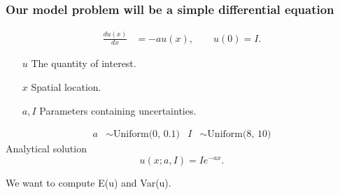 \documentclass[handout]{beamer}
\begin{document}
\begin{frame}
 \frametitle{Our model problem will be a simple differential equation}
 \vspace{-10mm}
  \begin{align*}
    \frac{d u(x)}{dx} & =-au(x),\qquad u(0) = I.
  \end{align*}
  \vspace{-5 mm}
  \begin{itemize}
    \item[$u$] The quantity of interest.
    \item[$x$] Spatial location.
    \item[$a,I$] Parameters containing uncertainties.
  \end{itemize}

\vspace{-5 mm}
 \pause
\begin{align*}
a &\sim \text{Uniform(0, 0.1)} & I& \sim \text{Uniform(8, 10)}
\end{align*}
\pause
\vspace{5 mm}
Analytical solution
\[u(x; a, I) = Ie^{-ax}.\]

\pause
\vspace{5mm}
We want to compute E(u) and Var(u).

\end{frame}
\end{document}
